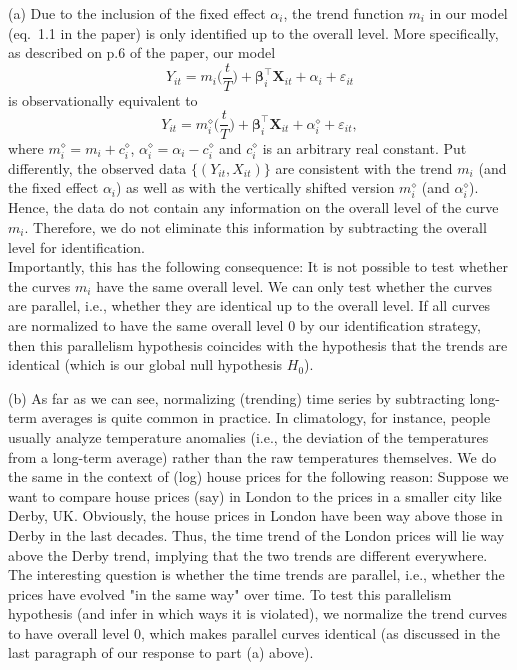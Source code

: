 \documentclass[a4paper,12pt]{article}
\begin{document}
\begin{enumerate}[label=\arabic*.,leftmargin=0.6cm]
(a) Due to the inclusion of the fixed effect $\alpha_i$, the trend function $m_i$ in our model (eq.\ 1.1 in the paper) is only identified up to the overall level. More specifically, as described on p.6 of the paper, our model 
\begin{equation}\label{model1}
Y_{it} = m_i\Big(\frac{t}{T}\Big) + \boldsymbol{\beta}_i^\top \boldsymbol{X}_{it} + \alpha_i + \varepsilon_{it} 
\end{equation}
is observationally equivalent to 
\begin{equation}\label{model2}
Y_{it} = m_i^\diamond\Big(\frac{t}{T}\Big) + \boldsymbol{\beta}_i^\top \boldsymbol{X}_{it} + \alpha_i^\diamond + \varepsilon_{it}, 
\end{equation}
where $m_i^\diamond = m_i + c_i^\diamond$, $\alpha_i^\diamond = \alpha_i - c_i^\diamond$ and $c_i^\diamond$ is an arbitrary real constant. Put differently, the observed data $\{(Y_{it},X_{it})\}$ are consistent with the trend $m_i$ (and the fixed effect $\alpha_i$) as well as with the vertically shifted version $m_i^\diamond$ (and $\alpha_i^\diamond$). Hence, the data do not contain any information on the overall level of the curve $m_i$. Therefore, we do not eliminate this information by subtracting the overall level for identification. \\
Importantly, this has the following consequence: It is not possible to test whether the curves $m_i$ have the same overall level. We can only test whether the curves are parallel, i.e., whether they are identical up to the overall level. If all curves are normalized to have the same overall level $0$ by our identification strategy, then this parallelism hypothesis coincides with the hypothesis that the trends are identical (which is our global null hypothesis $H_0$).  

(b) As far as we can see, normalizing (trending) time series by subtracting long-term averages is quite common in practice. In climatology, for instance, people usually analyze temperature anomalies (i.e., the deviation of the temperatures from a long-term average) rather than the raw temperatures themselves. We do the same in the context of (log) house prices for the following reason: Suppose we want to compare house prices (say) in London to the prices in a smaller city like Derby, UK. Obviously, the house prices in London have been way above those in Derby in the last decades. 
Thus, the time trend of the London prices will lie way above the Derby trend, implying that the two trends are different everywhere. The interesting question is whether the time trends are parallel, i.e., whether the prices have evolved "in the same way" over time. To test this parallelism hypothesis (and infer in which ways it is violated), we normalize the trend curves to have overall level $0$, which makes parallel curves identical (as discussed in the last paragraph of our response to part (a) above). 


\end{enumerate}
\end{document}
